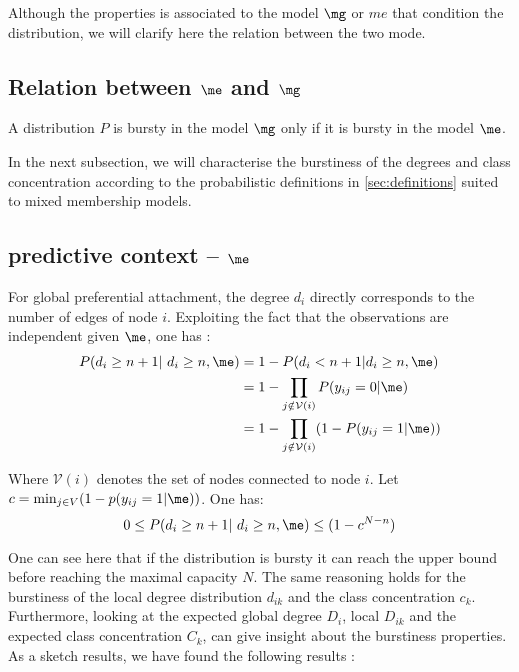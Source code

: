 Although the properties is associated to the model $\mg$ or $me$ that condition the distribution, we will clarify here the relation between the two mode.

\subsection{Relation between $\me$ and $\mg$}

\begin{proposition} \label{th:me2mg}
    A distribution $P$ is bursty in the model $\mg$ only if it is bursty in the model $\me$.
\end{proposition}

In the next subsection, we will characterise the burstiness of the degrees and class concentration according to the probabilistic definitions in \ref{sec:definitions} suited to mixed membership models.

\subsection{predictive context -- $\me$}

For global preferential attachment, the degree $d_i$ directly corresponds to the number of edges of node $i$. Exploiting the fact that the observations are independent given $\me$, one has : 
\begin{align*}
    P(d_i \geq n+1 | d_i \geq n, \me) &= 1 - P(d_i < n+1 | d_i \geq n, \me) \\
        &= 1 - \prod_{j \notin \mathcal{V}(i)} P(y_{ij} = 0 | \me) \\
        &= 1 - \prod_{j \notin \mathcal{V}(i)}( 1 -  P(y_{ij} = 1 | \me) )
\end{align*}

Where $\mathcal{V}(i)$ denotes the set of nodes connected to node $i$. Let $c=\min_{j \in V}  (1-p(y_{ij} = 1 | \me))$. One has: 
\begin{equation} \label{eq:me_upper_bound}
    0 \le P(d_i \geq n+1 | d_i \geq n, \me) \leq (1 - c^{N-n})
\end{equation}


One can see here that if the distribution is bursty it can reach the upper bound before reaching the maximal capacity $N$.
The same reasoning holds for the burstiness of the local degree distribution $d_{ik}$ and the class concentration $c_k$.~\\


Furthermore, looking at the expected global degree $D_i$, local $D_{ik}$ and the expected class concentration $C_k$,  can give insight about the burstiness properties. As a sketch results, we have found the following results : 

